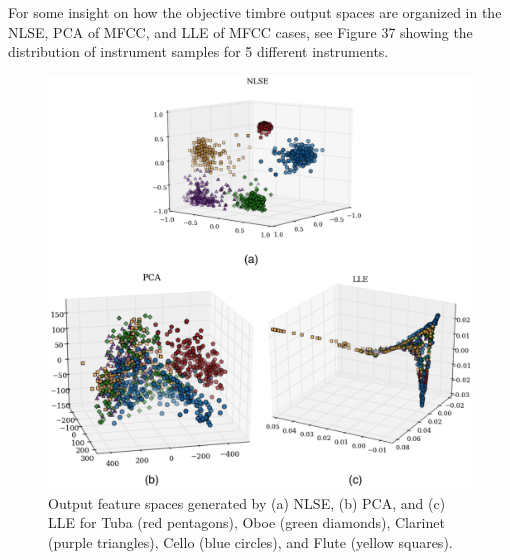 \documentclass[12pt]{report} 	%
\numberwithin{figure}{chapter}
\numberwithin{table}{chapter}
\numberwithin{equation}{chapter}
\begin{document}
\begin{flushleft}
For some insight on how the objective timbre output spaces are organized in the NLSE, PCA of MFCC, and LLE of MFCC cases, see Figure 37 showing the distribution of instrument samples for 5 different instruments.
\begin{figure}[h!]
\begin{center}
\includegraphics[width=\linewidth]{NLSECluster}
\caption[NLSE vs. PCA vs. LLE instrument clusters]{Output feature spaces generated by (a) NLSE, (b) PCA, and (c) LLE for Tuba (red pentagons), Oboe (green diamonds), Clarinet (purple triangles), Cello (blue circles), and Flute (yellow squares).}
\end{center}
\end{figure}


\end{flushleft}
\end{document}
